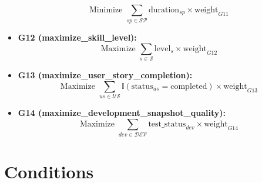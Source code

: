\documentclass{article}
\begin{document}
\begin{itemize}
    \[
    \text{Minimize } \sum_{sp \in \mathcal{SP}} \text{duration}_{sp} \times \text{weight}_{G11}
    \]
    \item \textbf{G12 (maximize\_skill\_level):}
    \[
    \text{Maximize } \sum_{s \in \mathcal{S}} \text{level}_s \times \text{weight}_{G12}
    \]
    \item \textbf{G13 (maximize\_user\_story\_completion):}
    \[
    \text{Maximize } \sum_{us \in \mathcal{US}} \mathbb{I}(\text{status}_{us} = \text{completed}) \times \text{weight}_{G13}
    \]
    \item \textbf{G14 (maximize\_development\_snapshot\_quality):}
    \[
    \text{Maximize } \sum_{dev \in \mathcal{DEV}} \text{test\_status}_{dev} \times \text{weight}_{G14}
    \]
\end{itemize}

\section{Conditions}
\end{document}
